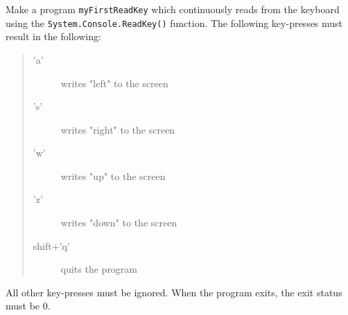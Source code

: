 Make a program \lstinline{myFirstReadKey} which continuously reads
from the keyboard using the \lstinline{System.Console.ReadKey()}
function. The following key-presses must result in the following:
\begin{quote}
  \begin{description}
  \item['a'] writes "left" to the screen
  \item['s'] writes "right" to the screen
  \item['w'] writes "up" to the screen
  \item['z'] writes "down" to the screen
  \item[shift+'q'] quits the program
  \end{description}
\end{quote}
All other key-presses must be ignored. When the program exits,
the exit status must be 0.
